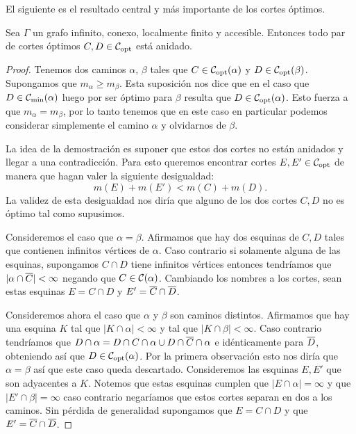 \documentclass[tesis.tex]{subfiles}
\begin{document}
El siguiente es el resultado central y más importante de los cortes óptimos.

\begin{teo}\label{teo_copt_anidados}
	Sea $\Gamma$ un grafo infinito, conexo, localmente finito y accesible.
	Entonces todo par de cortes óptimos $C,D \in {\cal C}_{\text{opt}}$ está anidado.
\end{teo}
\begin{proof}
	Tenemos dos caminos $\alpha$, $\beta$ tales que $C \in {\cal C}_{\text{opt}}(\alpha)$ y $D \in {\cal C}_{\text{opt}}(\beta)$.
	Supongamos que $m_{\alpha} \ge m_{\beta}$.
	Esta suposición nos dice que en el caso que $D \in {\cal C}_{\text{min}}(\alpha)$ luego por ser óptimo para $\beta$ resulta que $D \in {\cal C}_{\text{opt}}(\alpha)$.
	Esto fuerza a que $m_{\alpha} = m_{\beta}$, por lo tanto tenemos que en este caso en particular podemos considerar simplemente el camino $\alpha$ y olvidarnos de $\beta$.
	
	La idea de la demostración es suponer que estos dos cortes no están anidados y llegar a una contradicción.
	Para esto queremos encontrar cortes $E, E' \in {\cal C}_{\text{opt}}$ de manera que hagan valer la siguiente desigualdad:
	\[
		m(E) + m(E') < m(C) + m(D).
	\]   
	La validez de esta desigualdad nos diría que alguno de los dos cortes $C,D$ no es óptimo tal como supusimos.
	
	Consideremos el caso que $\alpha = \beta$.
	Afirmamos que hay dos esquinas de $C,D$ tales que contienen infinitos vértices de $\alpha$.
	Caso contrario si solamente alguna de las esquinas, supongamos $C \cap D$ tiene infinitos vértices entonces tendríamos que $|\alpha \cap \overline C| < \infty$ negando que $C \in {\cal C}(\alpha)$.
	Cambiando los nombres a los cortes, sean estas esquinas $E = C \cap D$ y $E' = \overline C \cap \overline D$.
	
	Consideremos ahora el caso que $\alpha$ y $\beta$ son caminos distintos.
	Afirmamos que hay una esquina $K$ tal que $|K \cap \alpha| < \infty$ y tal que $|K \cap \beta| < \infty$.
	Caso contrario tendríamos que $D \cap \alpha = D \cap C \cap \alpha  \cup D \cap \overline C \cap \alpha$ e idénticamente para $\overline D$, obteniendo así que $D \in {\cal C}_{\text{opt}}(\alpha)$.
	Por la primera observación esto nos diría que $\alpha = \beta$ así que este caso queda descartado.
	Consideremos las esquinas $E,E'$ que son adyacentes a $K$.
	Notemos que estas esquinas cumplen que $|E \cap \alpha| = \infty$ y que $|E' \cap \beta| = \infty$ caso contrario negaríamos que estos cortes separan en dos a los caminos.
	Sin pérdida de generalidad supongamos que $E = C \cap D$ y que $E' = \overline C \cap \overline D$.
	

\end{proof}
\end{document}
